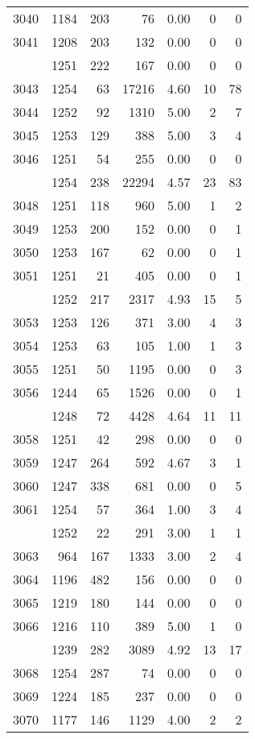 \documentclass[
]{article}
\begin{document}
\begin{table}
\begin{tabular}[t]{lrrrrrr}
3040 & 1184 & 203 & 76 & 0.00 & 0 & 0\\
3041 & 1208 & 203 & 132 & 0.00 & 0 & 0\\
\addlinespace
3042 & 1251 & 222 & 167 & 0.00 & 0 & 0\\
3043 & 1254 & 63 & 17216 & 4.60 & 10 & 78\\
3044 & 1252 & 92 & 1310 & 5.00 & 2 & 7\\
3045 & 1253 & 129 & 388 & 5.00 & 3 & 4\\
3046 & 1251 & 54 & 255 & 0.00 & 0 & 0\\
\addlinespace
3047 & 1254 & 238 & 22294 & 4.57 & 23 & 83\\
3048 & 1251 & 118 & 960 & 5.00 & 1 & 2\\
3049 & 1253 & 200 & 152 & 0.00 & 0 & 1\\
3050 & 1253 & 167 & 62 & 0.00 & 0 & 1\\
3051 & 1251 & 21 & 405 & 0.00 & 0 & 1\\
\addlinespace
3052 & 1252 & 217 & 2317 & 4.93 & 15 & 5\\
3053 & 1253 & 126 & 371 & 3.00 & 4 & 3\\
3054 & 1253 & 63 & 105 & 1.00 & 1 & 3\\
3055 & 1251 & 50 & 1195 & 0.00 & 0 & 3\\
3056 & 1244 & 65 & 1526 & 0.00 & 0 & 1\\
\addlinespace
3057 & 1248 & 72 & 4428 & 4.64 & 11 & 11\\
3058 & 1251 & 42 & 298 & 0.00 & 0 & 0\\
3059 & 1247 & 264 & 592 & 4.67 & 3 & 1\\
3060 & 1247 & 338 & 681 & 0.00 & 0 & 5\\
3061 & 1254 & 57 & 364 & 1.00 & 3 & 4\\
\addlinespace
3062 & 1252 & 22 & 291 & 3.00 & 1 & 1\\
3063 & 964 & 167 & 1333 & 3.00 & 2 & 4\\
3064 & 1196 & 482 & 156 & 0.00 & 0 & 0\\
3065 & 1219 & 180 & 144 & 0.00 & 0 & 0\\
3066 & 1216 & 110 & 389 & 5.00 & 1 & 0\\
\addlinespace
3067 & 1239 & 282 & 3089 & 4.92 & 13 & 17\\
3068 & 1254 & 287 & 74 & 0.00 & 0 & 0\\
3069 & 1224 & 185 & 237 & 0.00 & 0 & 0\\
3070 & 1177 & 146 & 1129 & 4.00 & 2 & 2\\

\end{tabular}
\end{table}
\end{document}
